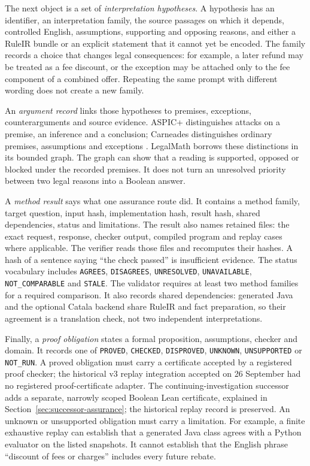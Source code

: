 \documentclass[12pt,a4paper,oneside,openany]{book}
\begin{document}
The next object is a set of \emph{interpretation hypotheses}. A hypothesis has
an identifier, an interpretation family, the source passages on which it
depends, controlled English, assumptions, supporting and opposing reasons, and
either a RuleIR bundle or an explicit statement that it cannot yet be encoded.
The family records a choice that changes legal consequences: for example, a
later refund may be treated as a fee discount, or the exception may be attached
only to the fee component of a combined offer. Repeating the same prompt with
different wording does not create a new family.

An \emph{argument record} links those hypotheses to premises, exceptions,
counterarguments and source evidence. ASPIC+ distinguishes attacks on a
premise, an inference and a conclusion; Carneades distinguishes ordinary
premises, assumptions and exceptions \citep[secs.~2--3]{aspic2010}
\citep[secs.~3--6]{carneades2007}. LegalMath borrows these distinctions in its
bounded graph. The graph can show that a reading is supported, opposed or
blocked under the recorded premises. It does not turn an unresolved priority
between two legal reasons into a Boolean answer.

A \emph{method result} says what one assurance route did. It contains a method
family, target question, input hash, implementation hash, result hash, shared
dependencies, status and limitations. The result also names retained files:
the exact request, response, checker output, compiled program and replay cases
where applicable. The verifier reads those files and recomputes their hashes.
A hash of a sentence saying ``the check passed'' is insufficient evidence.
The status vocabulary includes
\texttt{AGREES}, \texttt{DISAGREES}, \texttt{UNRESOLVED},
\texttt{UNAVAILABLE}, \texttt{NOT\_COMPARABLE} and \texttt{STALE}. The
validator requires at least two method families for a required comparison. It
also records shared dependencies: generated Java and the optional Catala backend
share RuleIR and fact preparation, so their agreement is a translation check,
not two independent interpretations.

Finally, a \emph{proof obligation} states a formal proposition, assumptions,
checker and domain. It records one of \texttt{PROVED}, \texttt{CHECKED}, \texttt{DISPROVED},
\texttt{UNKNOWN}, \texttt{UNSUPPORTED} or \texttt{NOT\_RUN}. A proved
obligation must carry a certificate accepted by a registered proof checker;
the historical v3 replay integration accepted on 26 September had no registered
proof-certificate adapter. The continuing-investigation successor adds a
separate, narrowly scoped Boolean Lean certificate, explained in
Section~\ref{sec:successor-assurance}; the historical replay record is preserved.
An unknown or unsupported obligation
must carry a limitation. For example, a finite exhaustive replay can establish
that a generated Java class agrees with a Python evaluator on the listed
snapshots. It cannot establish that the English phrase ``discount of fees or
charges'' includes every future rebate.
\end{document}
